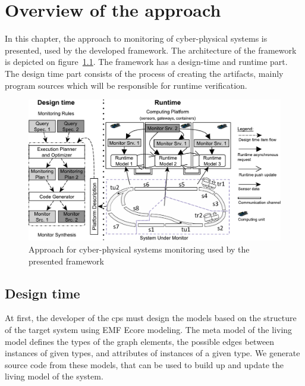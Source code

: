 
\chapter{Overview of the approach}


In this chapter, the approach to monitoring of cyber-physical systems is presented, used by the developed framework. 
The architecture of the framework is depicted on figure~\ref{fig:approach}. 
The framework has a design-time and runtime part.
The design time part consists of the process of creating the artifacts, mainly program sources which will be responsible for runtime verification.

\begin{figure}[h]
	\begin{center}
		\includegraphics[width=\textwidth]{figures/fase-overview-crop.pdf}
		\caption{Approach for cyber-physical systems monitoring used by the presented framework }
		\label{fig:approach}
	\end{center}
\end{figure}

\section{Design time}

At first, the developer of the cps must design the models based on the structure of the target system using EMF Ecore modeling. 
The meta model of the living model defines the types of the graph elements, the possible edges between instances of given types, and attributes of instances of a given type. 
We generate \cpp{} source code from these models, that can be used to build up and update the living model of the system.

